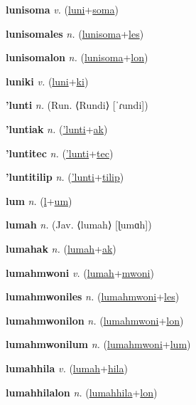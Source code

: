 \textbf{\hypertarget{lunisoma}{lunisoma}} \textit{v.} (\hyperlink{luni}{luni}+\allowbreak \hyperlink{soma}{soma})


\textbf{\hypertarget{lunisomales}{lunisomales}} \textit{n.} (\hyperlink{lunisoma}{lunisoma}+\allowbreak \hyperlink{les}{les})


\textbf{\hypertarget{lunisomalon}{lunisomalon}} \textit{n.} (\hyperlink{lunisoma}{lunisoma}+\allowbreak \hyperlink{lon}{lon})


\textbf{\hypertarget{luniki}{luniki}} \textit{v.} (\hyperlink{luni}{luni}+\allowbreak \hyperlink{ki}{ki})


\textbf{\hypertarget{'lunti}{'lunti}} \textit{n.} (Run. ⟨Rundi⟩ [ˈɾundi])


\textbf{\hypertarget{'luntiak}{'luntiak}} \textit{n.} (\hyperlink{'lunti}{'lunti}+\allowbreak \hyperlink{ak}{ak})


\textbf{\hypertarget{'luntitec}{'luntitec}} \textit{n.} (\hyperlink{'lunti}{'lunti}+\allowbreak \hyperlink{tec}{tec})


\textbf{\hypertarget{'luntitilip}{'luntitilip}} \textit{n.} (\hyperlink{'lunti}{'lunti}+\allowbreak \hyperlink{tilip}{tilip})


\textbf{\hypertarget{lum}{lum}} \textit{n.} (\hyperlink{l}{l}+\allowbreak \hyperlink{um}{um})


\textbf{\hypertarget{lumah}{lumah}} \textit{n.} (Jav. ⟨lumah⟩ [ɭumɑh])


\textbf{\hypertarget{lumahak}{lumahak}} \textit{n.} (\hyperlink{lumah}{lumah}+\allowbreak \hyperlink{ak}{ak})


\textbf{\hypertarget{lumahmwoni}{lumahmwoni}} \textit{v.} (\hyperlink{lumah}{lumah}+\allowbreak \hyperlink{mwoni}{mwoni})


\textbf{\hypertarget{lumahmwoniles}{lumahmwoniles}} \textit{n.} (\hyperlink{lumahmwoni}{lumahmwoni}+\allowbreak \hyperlink{les}{les})


\textbf{\hypertarget{lumahmwonilon}{lumahmwonilon}} \textit{n.} (\hyperlink{lumahmwoni}{lumahmwoni}+\allowbreak \hyperlink{lon}{lon})


\textbf{\hypertarget{lumahmwonilum}{lumahmwonilum}} \textit{n.} (\hyperlink{lumahmwoni}{lumahmwoni}+\allowbreak \hyperlink{lum}{lum})


\textbf{\hypertarget{lumahhila}{lumahhila}} \textit{v.} (\hyperlink{lumah}{lumah}+\allowbreak \hyperlink{hila}{hila})


\textbf{\hypertarget{lumahhilalon}{lumahhilalon}} \textit{n.} (\hyperlink{lumahhila}{lumahhila}+\allowbreak \hyperlink{lon}{lon})


